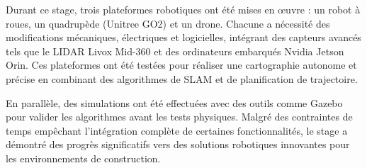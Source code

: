 \documentclass[12pt]{article}
\begin{document}
Durant ce stage, trois plateformes robotiques ont été mises en œuvre : un robot à roues, un quadrupède (Unitree GO2) et un drone. Chacune a nécessité des modifications mécaniques, électriques et logicielles, intégrant des capteurs avancés tels que le LIDAR Livox Mid-360 et des ordinateurs embarqués Nvidia Jetson Orin. Ces plateformes ont été testées pour réaliser une cartographie autonome et précise en combinant des algorithmes de SLAM et de planification de trajectoire.

En parallèle, des simulations ont été effectuées avec des outils comme Gazebo pour valider les algorithmes avant les tests physiques. Malgré des contraintes de temps empêchant l'intégration complète de certaines fonctionnalités, le stage a démontré des progrès significatifs vers des solutions robotiques innovantes pour les environnements de construction.


    
\end{document}
